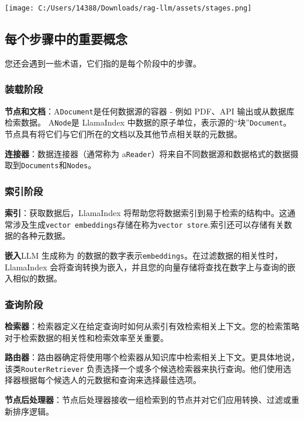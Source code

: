 \documentclass[
]{article}
\begin{document}
\texttt{[image: C:/Users/14388/Downloads/rag-llm/assets/stages.png]}

\subsection{每个步骤中的重要概念}\label{ux6bcfux4e2aux6b65ux9aa4ux4e2dux7684ux91cdux8981ux6982ux5ff5}

您还会遇到一些术语，它们指的是每个阶段中的步骤。

\subsubsection{装载阶段}\label{ux88c5ux8f7dux9636ux6bb5}

\textbf{节点和文档}：A\texttt{Document}是任何数据源的容器 - 例如
PDF、API 输出或从数据库检索数据。 A\texttt{Node}是 LlamaIndex
中数据的原子单位，表示源的``块''\texttt{Document}。节点具有将它们与它们所在的文档以及其他节点相关联的元数据。

\textbf{连接器}：数据连接器（通常称为
a\texttt{Reader}）将来自不同数据源和数据格式的数据摄取到\texttt{Documents}和\texttt{Nodes}。

\subsubsection{索引阶段}\label{ux7d22ux5f15ux9636ux6bb5}

\textbf{索引}：获取数据后，LlamaIndex
将帮助您将数据索引到易于检索的结构中。这通常涉及生成\texttt{vector\ embeddings}存储在称为\texttt{vector\ store}.索引还可以存储有关数据的各种元数据。

\textbf{嵌入}LLM 生成称为
的数据的数字表示\texttt{embeddings}。在过滤数据的相关性时，LlamaIndex
会将查询转换为嵌入，并且您的向量存储将查找在数字上与查询的嵌入相似的数据。

\subsubsection{查询阶段}\label{ux67e5ux8be2ux9636ux6bb5}

\textbf{检索器}：检索器定义在给定查询时如何从索引有效检索相关上下文。您的检索策略对于检索数据的相关性和检索效率至关重要。

\textbf{路由器}：路由器确定将使用哪个检索器从知识库中检索相关上下文。更具体地说，该类\texttt{RouterRetriever}
负责选择一个或多个候选检索器来执行查询。他们使用选择器根据每个候选人的元数据和查询来选择最佳选项。

\textbf{节点后处理器}：节点后处理器接收一组检索到的节点并对它们应用转换、过滤或重新排序逻辑。
\end{document}
